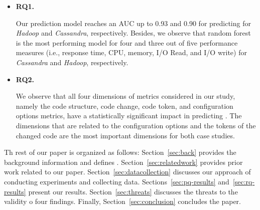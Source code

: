 \begin{itemize}
    
    \item \textbf{RQ1. \RQII}
    
    Our prediction model reaches an AUC up to 0.93 and 0.90 for predicting \inconsistent for \emph{Hadoop} and \emph{Cassandra}, respectively. Besides, we observe that random forest is the most performing model for four and three out of five performance measures (i.e., response time, CPU, memory, I/O Read, and I/O write) for \emph{Cassandra} and \emph{Hadoop}, respectively. 
    
    \item\textbf{RQ2. \RQIII}
    
    We observe that all four dimensions of metrics considered in our study, namely the code structure, code change, code token, and configuration options metrics, have a statistically significant impact in predicting \inconsistent. The dimensions that are related to the configuration options and the tokens of the changed code are the most important dimensions for both case studies. 
    
\end{itemize}

 Th rest of our paper is organized as follows: Section~\ref{sec:back} provides the background information and defines \inconsistent. Section~\ref{sec:relatedwork} provides prior work related to our paper. Section~\ref{sec:datacollection} discusses our approach of conducting experiments and collecting data. Sections~\ref{sec:pq-results} and~\ref{sec:rq-results} present our results. Section~\ref{sec:threats} discusses the threats to the validity o four findings. Finally, Section~\ref{sec:conclusion} concludes the paper. 